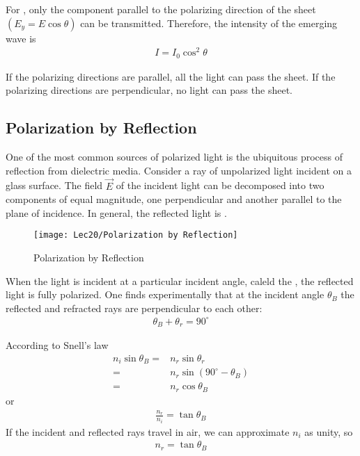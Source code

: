 For , only the component parallel to the polarizing direction of the sheet $(E_y=E\cos\theta)$ can be transmitted. Therefore, the intensity of the emerging wave is 
\begin{align*}
    I=I_0\cos^2\theta
\end{align*}

If the polarizing directions are parallel, all the light can pass the sheet. If the polarizing directions are perpendicular, no light can pass the sheet. 

\subsection{Polarization by Reflection}
One of the most common sources of polarized light is the ubiquitous process of reflection from dielectric media. Consider a ray of unpolarized light incident on a glass surface. The field $\vec{E}$ of the incident light can be decomposed into two components of equal magnitude, one perpendicular and another parallel to the plane of incidence. In general, the reflected light is . 

\begin{figure}[H]
    \centering
    \texttt{[image: Lec20/Polarization by Reflection]}
    \caption{Polarization by Reflection}
\end{figure}

When the light is incident at a particular incident angle, caleld the , the reflected light is fully polarized. One finds experimentally that at the incident angle $\theta_B$ the reflected and refracted rays are perpendicular to each other:
\begin{align*}
    \theta_B+\theta_r=90^{\circ}
\end{align*}

According to Snell's law
\begin{align*}
    n_i\sin\theta_B=&n_r\sin\theta_r\\
    =&n_r\sin(90^{\circ}-\theta_B)\\
    =&n_r\cos\theta_B
\end{align*}
or 
\begin{align*}
    \frac{n_r}{n_i}=\tan\theta_B
\end{align*}
If the incident and reflected rays travel in air, we can approximate $n_i$ as unity, so
\begin{align*}
    n_r=\tan\theta_B
\end{align*}